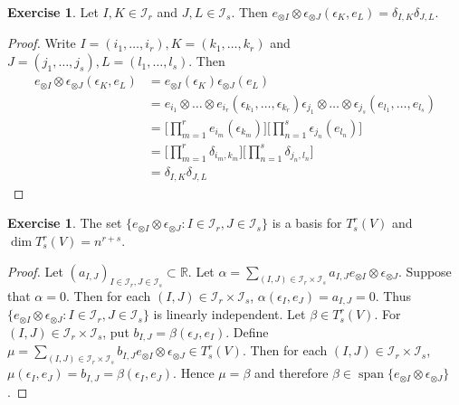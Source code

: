 \documentclass[12pt]{amsart}
\theoremstyle{definition}
\theoremstyle{definition}
\newtheorem{ex}[definition]{Exercise}
\newcommand{\al}{\alpha}
\newcommand{\bet}{\beta}
\newcommand{\del}{\delta}
\newcommand{\ep}{\epsilon}
\newcommand{\R}{\mathbb{R}}
\newcommand{\MI}{\mathcal{I}}
\DeclareMathOperator{\spn}{span}
\begin{document}
	\begin{ex}
	Let $I, K \in \MI_r$  and $J, L \in \MI_s$. Then $e_{\otimes I} \otimes \ep_{\otimes J}(\ep_K, e_L) = \del_{I,K} \del_{J,L}$. 
	\end{ex}	
	
	\begin{proof}
	Write $I = (i_1, \dots, i_r), K=(k_1, \dots, k_r)$ and $J = (j_1, \dots, j_s), L = (l_1, \dots, l_s)$. Then 
	\begin{align*}
	e_{\otimes I} \otimes \ep_{\otimes J}(\ep_K, e_L) 
	&= e_{\otimes I}(\ep_K)\ep_{\otimes J}(e_L) \\
	&= e_{i_1}\otimes \dots \otimes e_{i_r}(\ep_{k_1}, \dots, \ep_{k_r}) \ep_{j_1}\otimes \dots \otimes \ep_{j_s}(e_{l_1}, \dots, e_{l_s}) \\
	&=\bigg[\prod_{m=1}^r e_{i_m}(\ep_{k_m}) \bigg] \bigg[ \prod_{n=1}^s  \ep_{j_n}(e_{l_n}) \bigg] \\
	&= \bigg[\prod_{m=1}^r \del_{i_m, k_m} \bigg] \bigg[ \prod_{n=1}^s  \del_{j_n, l_n} \bigg] \\
	&= \del_{I,K}\del_{J,L}
	\end{align*}
\end{proof}		
		
	\begin{ex}
		The set $\{e_{\otimes I} \otimes \ep_{\otimes J}: I \in \MI_r, J \in \MI_s\}$ is a basis for $T^r_s(V)$ and $\dim T^r_s(V) = {n^{r+s}}$.
	\end{ex}

	\begin{proof}
		Let $(a_{I,J})_{I \in \MI_r, J \in \MI_s} \subset \R$. Let $\al = \sum\limits_{(I,J) \in \MI_r \times \MI_s} a_{I,J} e_{\otimes I} \otimes  \ep_{\otimes J}$. 
		Suppose that $\al = 0$. Then for each $(I,J) \in \MI_r \times \MI_s$, $\al(\ep_I, e_J) = a_{I,J} = 0$. Thus $\{e_{\otimes I} \otimes \ep_{\otimes J}: I \in \MI_r, J \in \MI_s\}$ is linearly independent. Let $\bet \in T^r_s(V)$. For $(I,J) \in \MI_r \times \MI_s$, put $b_{I,J} = \bet(\ep_J, e_I)$. Define $\mu = \sum\limits_{(I,J) \in \MI_r \times \MI_s} b_{I,J} e_{\otimes I} \otimes \ep_{\otimes J} \in T^r_s(V)$. Then for each $(I,J) \in \MI_r \times \MI_s$, $\mu(\ep_I, e_J) = b_{I,J} = \bet(\ep_I, e_J)$. Hence $\mu = \bet$ and therefore $\bet \in \spn \{e_{\otimes I} \otimes \ep_{\otimes J} \}$.
	\end{proof}		
		
		
		
		
	
	
	
\end{document}
